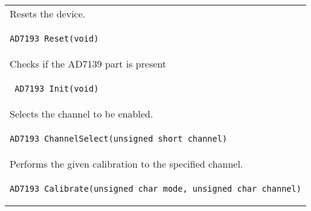 \documentclass[10pt,a4paper]{report}
\begin{document}
\begin{tabular}{|l|}
  \hline
Resets the device.\\
\begin{lstlisting} 
AD7193_Reset(void)
\end{lstlisting} \\
\hline


Checks if the AD7139 part is present\\
\begin{lstlisting}
 AD7193_Init(void)
\end{lstlisting} \\
\hline

Selects the channel to be enabled.\\
\begin{lstlisting}
AD7193_ChannelSelect(unsigned short channel)
\end{lstlisting} \\
\hline

Performs the given calibration to the specified channel.\\
\begin{lstlisting}
AD7193_Calibrate(unsigned char mode, unsigned char channel)
\end{lstlisting} \\
\hline


\end{tabular}
\end{document}
